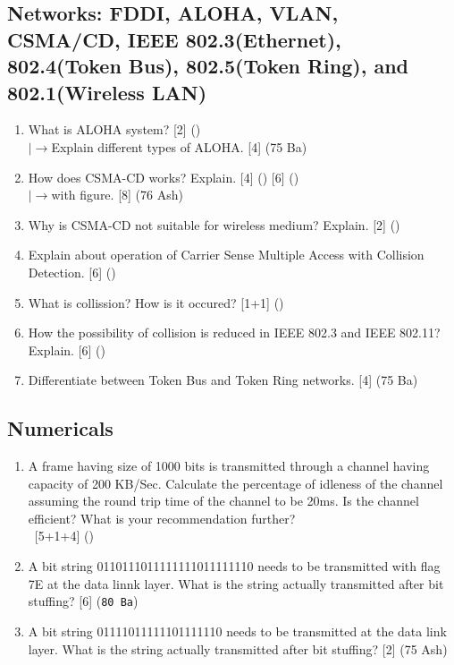 \documentclass[12pt]{article}
\newcommand{\lb}{\\$\left|\rightarrow\right.$}
\newcommand{\enter}{\\\textcolor{white}{1}}
\begin{document}
	\subsection{Networks: FDDI, ALOHA, VLAN, CSMA/CD, IEEE 802.3(Ethernet), 802.4(Token Bus), 802.5(Token Ring), and 802.1(Wireless LAN)}
		\begin{enumerate}[noitemsep, topsep=0pt]
			\item What is ALOHA system? \hfill [2] ()
			\lb Explain different types of ALOHA. \hfill [4] (75 Ba)
			
			\item How does CSMA-CD works? Explain. \hfill [4] () [6] ()
			\lb with figure. \hfill [8] (76 Ash)

			\item Why is CSMA-CD not suitable for wireless medium? Explain. \hfill [2] ()
			
			\item Explain about operation of Carrier Sense Multiple Access with Collision Detection. \hfill [6] ()
			
			\item What is collission? How is it occured? \hfill [1+1] ()

			\item How the possibility of collision is reduced in IEEE 802.3 and IEEE 802.11? Explain. \hfill [6] ()

			\item Differentiate between Token Bus and Token Ring networks. \hfill [4] (75 Ba)
		\end{enumerate}
			
	\subsection{Numericals}
		\begin{enumerate}[noitemsep, topsep=0pt]
			\item A frame having size of 1000 bits is transmitted through a channel having capacity of 200 KB/Sec. Calculate the percentage of idleness of the channel assuming the round trip time of the channel to be 20ms. Is the channel efficient? What is your recommendation further?
			\enter\hfill [5+1+4] ()

			\item A bit string 0110111011111111011111110 needs to be transmitted with flag 7E at the data linnk layer. What is the string actually transmitted after bit stuffing? \hfill [6] (\texttt{80 Ba})

			\item A bit string 01111011111101111110 needs to be transmitted at the data link layer. What is the string actually transmitted after bit stuffing? \hfill [2] (75 Ash)
		\end{enumerate}
\end{document}
